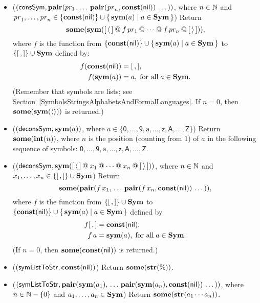 \begin{itemize}
\item ($(\mathsf{consSym}, \mathbf{pair}(pr_1,\, \ldots\,
  \mathbf{pair}(\mathit{pr}_n,\mathbf{const}(\mathsf{nil}))\,\ldots\,))$, where $n\in\mathbb{N}$
  and $\mathit{pr}_1,\ldots,\mathit{pr}_n\in \{\mathbf{const}(\mathsf{nil})\} \cup
  \{ \, \mathbf{sym}(a) \mid a\in\mathbf{Sym} \, \}$)
  Return
  \begin{displaymath}
    \mathbf{some}(\mathbf{sym}([\,\langle\,] \mathbin{@} f\,pr_1 \mathbin{@} \cdots
    \mathbin{@} f\,pr_n \mathbin{@} [\,\rangle\,])) ,
  \end{displaymath}
  where $f$ is the function from $\{\mathbf{const}(\mathsf{nil})\} \cup
  \{ \, \mathbf{sym}(a) \mid a\in\mathbf{Sym} \, \}$ to $\{[\,,]\} \cup \mathbf{Sym}$ defined by:
  \begin{align*}
    f(\mathbf{const}(\mathsf{nil})) &= [\,,] , \\
    f(\mathbf{sym}(a)) &= a , \;\allowbreak\mbox{for all}\allowbreak\; a\in \mathbf{Sym} .
  \end{align*}
  (Remember that symbols are lists; see
  Section~\ref{SymbolsStringsAlphabetsAndFormalLanguages}.
  If $n=0$, then $\mathbf{some}(\mathbf{sym}(\langle\rangle))$ is returned.)

\item ($(\mathsf{deconsSym}, \mathbf{sym}(a))$, where
  $a\in\{\mathsf{0,\ldots,9,a,\ldots,z,A,\ldots,Z}\}$)
  Return $\mathbf{some}(\mathbf{int}(n))$, where $n$ is the position (counting from $1$)
  of $a$ in the following sequence of symbols:
  $\mathsf{0, \ldots, 9, a,\ldots,z, A, \ldots, Z}$.

\item ($(\mathsf{deconsSym}, \mathbf{sym}([\,\langle\,] \mathbin{@} x_1 \mathbin{@}
  \cdots \mathbin{@} x_n \mathbin{@} [\,\rangle\,]))$, where $n\in\mathbb{N}$
  and $x_1,\ldots,x_n\in \{[\,,]\} \cup \mathbf{Sym}$)
  Return
  \begin{displaymath}
    \mathbf{some}(\mathbf{pair}(f\,x_1, \,\ldots\, \mathbf{pair}(f\,x_n,
    \mathbf{const}(\mathsf{nil}))\,\ldots\,)) ,
  \end{displaymath}
  where $f$ is the function from $\{[\,,]\} \cup \mathbf{Sym}$
  to $\{\mathbf{const}(\mathsf{nil})\} \cup \{ \, \mathbf{sym}(a) \mid a\in\mathbf{Sym} \, \}$ defined by
  \begin{align*}
    f[\,,] &= \mathbf{const}(\mathsf{nil}) , \\
    f\,a &= \mathbf{sym}(a) , \;\allowbreak\mbox{for all}\allowbreak\; a\in\mathbf{Sym} .
  \end{align*}
  (If $n = 0$, then $\mathbf{some}(\mathbf{const}(\mathsf{nil}))$ is returned.)

\item ($(\mathsf{symListToStr}, \mathbf{const}(\mathsf{nil}))$)
  Return $\mathbf{some}(\mathbf{str}(\%))$.

\item ($(\mathsf{symListToStr}, \mathbf{pair}(\mathbf{sym}(a_1),\, \ldots\,
  \mathbf{pair}(\mathbf{sym}(a_n),\mathbf{const}(\mathsf{nil}))\,\ldots\,))$, where
  $n\in\mathbb{N}-\{0\}$ and $a_1,\ldots,a_n\in\mathbf{Sym}$)
  Return $\mathbf{some}(\mathbf{str}(a_1\cdots a_n))$.


\end{itemize}
